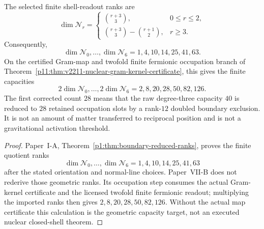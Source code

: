 \documentclass[12pt,a4paper]{article}
\begin{document}
\begin{theorem}
\label{p11:thm:native-boundary-reduced-shell-count}
The selected finite shell-readout ranks are
\[
        \dim\mathcal N_r
        =
        \begin{cases}
        \binom{r+3}{3}, & 0\leq r\leq2,\\[5pt]
        \binom{r+3}{3}-\binom{r+1}{2}, & r\geq3.
        \end{cases}
\]
Consequently,
\[
        \dim\mathcal N_0,
        \ldots,
        \dim\mathcal N_6
        =
        1,4,10,14,25,41,63.
\]
On the certified Gram-map and twofold finite fermionic occupation branch
of Theorem~\ref{p11:thm:v2211-nuclear-gram-kernel-certificate}, this gives
the finite capacities
\[
        2\dim\mathcal N_0,
        \ldots,
        2\dim\mathcal N_6
        =
        2,8,20,28,50,82,126.
\]
The first corrected count \(28\) means that the raw degree-three capacity
\(40\) is reduced to \(28\) retained occupation slots by a rank-\(12\)
doubled boundary exclusion.  It is not an amount of matter transferred to
reciprocal position and is not a gravitational activation threshold.
\end{theorem}

\begin{proof}
Paper~I-A, Theorem~\ref{p1:thm:boundary-reduced-ranks}, proves the finite quotient
ranks
\[
  \dim\mathcal N_0,\ldots,\dim\mathcal N_6=1,4,10,14,25,41,63
\]
after the stated orientation and normal-line choices.  Paper~VII-B does not
rederive those geometric ranks.  Its occupation step consumes the actual Gram-kernel certificate and the
licensed twofold finite fermionic readout; multiplying the imported ranks
then gives $2,8,20,28,50,82,126$. Without the actual map certificate this
calculation is the geometric capacity target, not an executed nuclear
closed-shell theorem.
\end{proof}
\end{document}
